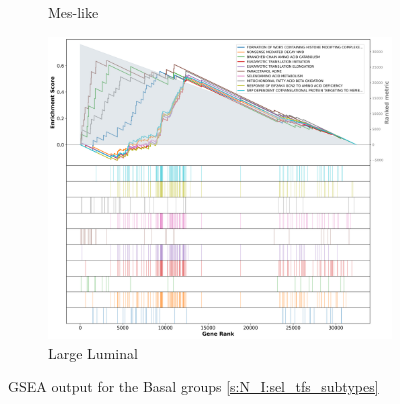 \begin{appendices}
\begin{figure}[!h]
\begin{subfigure}[!t]{0.4\textwidth}
        \caption{Mes-like}
        \label{fig:ap:gsea_mesLike}
    \end{subfigure} 
    \begin{subfigure}[!t]{0.4\textwidth}
        \centering
        \includegraphics[width=\textwidth,keepaspectratio]{Sections/Network_I/Resources/selective_pruning/gsea/largeLuminal_10_top_manTerms.png}
        \caption{Large Luminal}
        \label{fig:ap:gsea_largeLuminal}
    \end{subfigure}
    \caption{GSEA output for the Basal groups \cref{s:N_I:sel_tfs_subtypes}}
    \label{fig:ap:gsea_basal}
\end{figure}

\newpage


\end{appendices}
